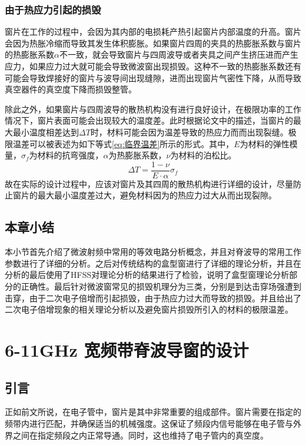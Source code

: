 \documentclass[master]{thesis-uestc}
\begin{document}
\subsection{由于热应力引起的损毁}
窗片在工作的过程中，会因为其内部的电损耗产热引起窗片内部温度的升高。窗片会因为热胀冷缩而导致其发生体积膨胀。如果窗片四周的夹具的热膨胀系数与窗片的热膨胀系数\(\alpha\)不一致，就会导致窗片与四周波导或者夹具之间产生挤压进而产生应力，如果应力过大就可能会导致微波窗出现损毁。这种不一致的热膨胀系数还有可能会导致焊接好的窗片与波导间出现缝隙，进而出现窗片气密性下降，从而导致真空器件的真空度下降而损毁整管。

除此之外，如果窗片与四周波导的散热机构没有进行良好设计，在极限功率的工作情况下，窗片表面可能会出现较大的温度差。此时根据论文\cite{lishengming_window_2017}中的描述，当窗片的最大最小温度相差达到\(\Delta T\)时，材料可能会因为温差导致的热应力而而出现裂缝。极限温差可以被表述为如下等式\ref{eq:临界温差}所示的形式。其中，\(E\)为材料的弹性模量，\(\sigma_f\)为材料的抗弯强度，\(\alpha\)为热膨胀系数，\(\nu\)为材料的泊松比。
\begin{equation}\label{eq:临界温差}
    \Delta T = \frac{1 - \nu}{E \cdot \alpha} \sigma_f
\end{equation}
故在实际的设计过程中，应该对窗片及其四周的散热机构进行详细的设计，尽量防止窗片的最大最小温度差过大，避免材料因为的热应力过大从而出现裂隙。

\section{本章小结}
本小节首先介绍了微波射频中常用的等效电路分析概念，并且对脊波导的常用工作参数进行了详细的分析。之后对传统结构的盒型窗进行了详细的理论分析，并且在分析的最后使用了HFSS对理论分析的结果进行了检验，说明了盒型窗理论分析部分的正确性。最后针对微波窗常见的损毁机理分为三类，分别是到达击穿场强遭到击穿，由于二次电子倍增而引起损毁，由于热应力过大而导致的损毁。并且给出了二次电子倍增现象的相关理论分析以及避免窗片损毁所引入的材料的极限温差。

\chapter{6-11GHz 宽频带脊波导窗的设计}
\section{引言}
正如前文所说，在电子管中，窗片是其中非常重要的组成部件。窗片需要在指定的频带内进行匹配，并确保适当的机械强度。这保证了频段内信号能够在电子管与外界之间在指定频段之内正常导通。同时，这也维持了电子管内的真空度。
\end{document}
